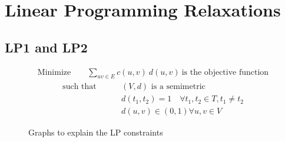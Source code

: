 \documentclass[11pt]{article}
\begin{document}
\section{Linear Programming  Relaxations}
\subsection{LP1 and LP2}
\begin{align*}
\text{Minimize} \qquad  \sum\limits_{uv \in E}{c(u, v) \ d(u, v)} \ \text{is the objective function}
\end{align*}
\vspace{-20pt}
\begin{align}    
\text{such that} \ \qquad & (V,d) \text{ is a semimetric}\\
&d(t_1, t_2) = 1 \quad \forall t_1, t_2 \in T, t_1 \neq t_2\\
&d(u, v) \in (0,1) \forall u, v \in V
\end{align}
\begin{figure}

\hfill
{}
\caption{Graphs to explain the LP constraints}
\label{fig:sample_graph}
\end{figure}
\end{document}
